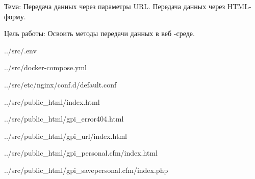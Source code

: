 Тема:
Передача данных через параметры URL. Передача данных через HTML-форму.

Цель работы:
Освоить методы передачи данных в веб -среде.


{../src/.env}


{../src/docker-compose.yml}


{../src/etc/nginx/conf.d/default.conf}


{../src/public_html/index.html}


{../src/public_html/gpi_error404.html}


{../src/public_html/gpi_url/index.html}


{../src/public_html/gpi_personal.cfm/index.html}

\newpage


{../src/public_html/gpi_savepersonal.cfm/index.php}
